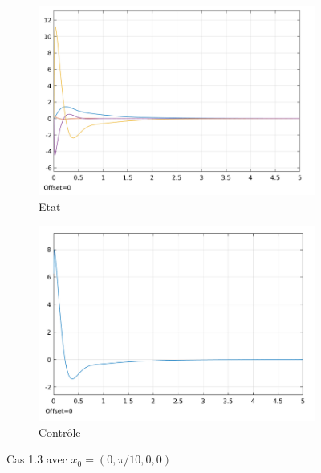 \documentclass[a4paper]{article}
\begin{document}
                        \begin{figure}[h!]
                                \centering
                                \begin{subfigure}[b]{0.45\textwidth}
                                        \includegraphics[width=\textwidth]{images/courbe_cas_1_3_TP03.png}
                                        \caption{Etat}
                                        \label{fig3.7.1}
                                \end{subfigure}
                                \hspace{30pt}
                                \begin{subfigure}[b]{0.45\textwidth}
                                        \includegraphics[width=\textwidth]{images/controle_cas_1_3_TP03.png}
                                        \caption{Contrôle}
                                        \label{fig3.7.2}
                                \end{subfigure}
                                \caption{Cas 1.3 avec $x_0=(0,\pi/10,0,0)$}
                                \label{fig3.7}
                        \end{figure}
\end{document}
